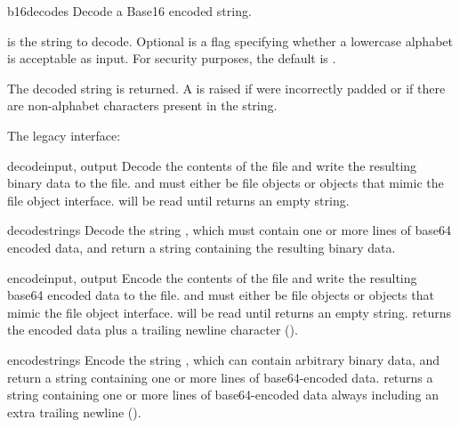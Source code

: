 \begin{funcdesc}{b16decode}{s}
Decode a Base16 encoded string.

 is the string to decode.  Optional  is a flag
specifying whether a lowercase alphabet is acceptable as input.  For
security purposes, the default is .

The decoded string is returned.  A  is raised if
 were incorrectly padded or if there are non-alphabet
characters present in the string.
\end{funcdesc}

The legacy interface:

\begin{funcdesc}{decode}{input, output}
Decode the contents of the  file and write the resulting
binary data to the  file.
 and  must either be file objects or objects that
mimic the file object interface.  will be read until
 returns an empty string.
\end{funcdesc}

\begin{funcdesc}{decodestring}{s}
Decode the string , which must contain one or more lines of
base64 encoded data, and return a string containing the resulting
binary data.
\end{funcdesc}

\begin{funcdesc}{encode}{input, output}
Encode the contents of the  file and write the resulting
base64 encoded data to the  file.
 and  must either be file objects or objects that
mimic the file object interface.  will be read until
 returns an empty string.  
returns the encoded data plus a trailing newline character
().
\end{funcdesc}

\begin{funcdesc}{encodestring}{s}
Encode the string , which can contain arbitrary binary data,
and return a string containing one or more lines of
base64-encoded data.   returns a
string containing one or more lines of base64-encoded data
always including an extra trailing newline ().
\end{funcdesc}

\begin{seealso}
\end{seealso}
